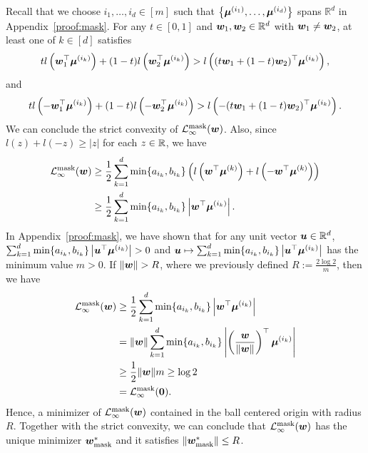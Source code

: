 Recall that we choose $i_1, \dots, i_d \in [m]$ such that $\left \{ {\bm{\mu}}^{(i_1)}, \dots, {\bm{\mu}}^{(i_d)} \right \}$ spans $\mathbb{R}^d$ in Appendix~\ref{proof:mask}. For any $t\in [0,1]$ and ${\bm{w}}_1,{\bm{w}}_2 \in \mathbb{R}^d$ with ${\bm{w}}_1 \neq {\bm{w}}_2$, at least one of $k \in [d]$ satisfies 
\begin{equation*}
    t l\left({\bm{w}}_1^\top {\bm{\mu}}^{(i_k)}\right) + (1-t) l\left({\bm{w}}_2^\top {\bm{\mu}}^{(i_k)}\right) >  l\left((t{\bm{w}}_1 + (1-t){\bm{w}}_2)^\top {\bm{\mu}}^{(i_k)}\right),
\end{equation*}
and
\begin{equation*}
    t l\left(- {\bm{w}}_1^\top {\bm{\mu}}^{(i_k)}\right) + (1-t) l\left(-{\bm{w}}_2^\top {\bm{\mu}}^{(i_k)}\right) >  l\left(-(t{\bm{w}}_1 + (1-t){\bm{w}}_2)^\top {\bm{\mu}}^{(i_k)}\right).
\end{equation*}
We can conclude the strict convexity of $\mathcal{L}_\infty^\mathrm{mask}({\bm{w}})$. Also, since $l(z) + l(-z) \geq |z|$ for each $z \in \mathbb{R}$, we have
\begin{align*}
    \mathcal{L}_\infty^\mathrm{mask}({\bm{w}})
    &\geq \frac{1}{2} \sum_{k=1}^d \min\{a_{i_k}, b_{i_k}\} \left(l\left({\bm{w}}^\top {\bm{\mu}}^{(k)}\right) + l\left(-{\bm{w}}^\top {\bm{\mu}}^{(k)}\right)\right)\\
    &\geq \frac{1}{2}\sum_{k=1}^d \min\{a_{i_k},b_{i_k}\} \left|{\bm{w}}^\top {\bm{\mu}}^{(i_k)}\right|.
\end{align*}
In Appendix~\ref{proof:mask}, we have shown that for any unit vector ${\bm{u}} \in \mathbb{R}^d$, $\sum_{k=1}^d \min\{a_{i_k},  b_{i_k}\} \left|{\bm{u}}^\top {\bm{\mu}}^{(i_k)}\right| >0$ and ${\bm{u}} \mapsto \sum_{k=1}^d \min\{a_{i_k},  b_{i_k}\} \left|{\bm{u}}^\top {\bm{\mu}}^{(i_k)}\right|$ has the minimum value $m>0$. If $\lVert {\bm{w}} \rVert > R$, where we previously defined $R:=\frac{2 \log 2}{m}$, then we have
\begin{align*}
    \mathcal{L}_\infty^\mathrm{mask}({\bm{w}})  &\geq \frac{1}{2} \sum_{k=1}^d \min\{a_{i_k},  b_{i_k}\} \left|{\bm{w}}^\top {\bm{\mu}}^{(i_k)}\right|\\ 
    &= \lVert {\bm{w}} \rVert \sum_{k=1}^d \min\{a_{i_k},  b_{i_k}\} \left|\left(\frac{{\bm{w}}}{\lVert {\bm{w}} \rVert}\right)^\top {\bm{\mu}}^{(i_k)}\right|\\ 
    &\geq \frac{1}{2}\lVert {\bm{w}} \rVert m \geq \log 2\\
    &= \mathcal{L}_\infty^\mathrm{mask}({\bm{0}}).
\end{align*}
Hence, a minimizer of $\mathcal{L}_\infty^\mathrm{mask}({\bm{w}})$ contained in the ball centered origin with radius $R$. Together with the strict convexity, we can conclude that $\mathcal{L}_\infty^\mathrm{mask}({\bm{w}})$ has the unique minimizer ${\bm{w}}_{\mathrm{mask}}^*$ and it satisfies $\lVert {\bm{w}}_{\mathrm{mask}}^* \rVert \leq R$.

